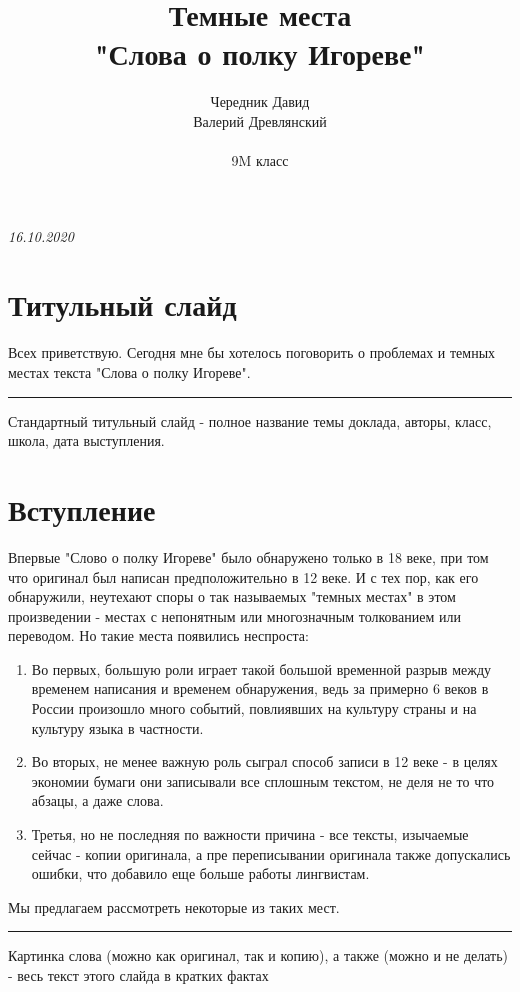 \documentclass[14pt, a4paper]{article}
\title{\Huge\bfseries Темные места \\ \Huge\bfseries "Слова о полку Игореве"}
\author{\huge Чередник Давид \\ \huge Валерий Древлянский \\\\ \Large 9M класс}
\date{}
\newcommand{\descr}[1]
  {\par\noindent\rule{0.5\textwidth}{0.4pt} \par {\large #1}}
\begin{document}
\clearpage\maketitle
\begin{center}
  \itshape 16.10.2020
\end{center}
\thispagestyle{empty}

\newpage

\tableofcontents

\newpage

{\Large

\section{Титульный слайд}
Всех приветствую. Сегодня мне бы хотелось поговорить о проблемах и темных местах текста "Слова о полку Игореве".
\descr{
  Стандартный титульный слайд - полное название темы доклада, авторы, класс, школа, дата выступления.}

\section{Вступление}
Впервые "Слово о полку Игореве" было обнаружено только в 18 веке, при том что оригинал был написан предположительно в 12 веке. И с тех пор, как его обнаружили, неутехают споры о так называемых "темных местах" в этом произведении - местах с непонятным или многозначным толкованием или переводом. Но такие места появились неспроста:
\begin{enumerate}
  \item Во первых, большую роли играет такой большой временной разрыв между временем написания и временем обнаружения, ведь за примерно 6 веков в России произошло много событий, повлиявших на культуру страны и на культуру языка в частности.
  \item Во вторых, не менее важную роль сыграл способ записи в 12 веке - в целях экономии бумаги они записывали все сплошным текстом, не деля не то что абзацы, а даже слова.
  \item Третья, но не последняя по важности причина - все тексты, изычаемые сейчас - копии оригинала, а пре переписывании оригинала также допускались ошибки, что добавило еще больше работы лингвистам.
\end{enumerate}
\par Мы предлагаем рассмотреть некоторые из таких мест.
\descr{
  Картинка слова (можно как оригинал, так и копию), а также (можно и не делать) - весь текст этого слайда в кратких фактах}

}
\end{document}
